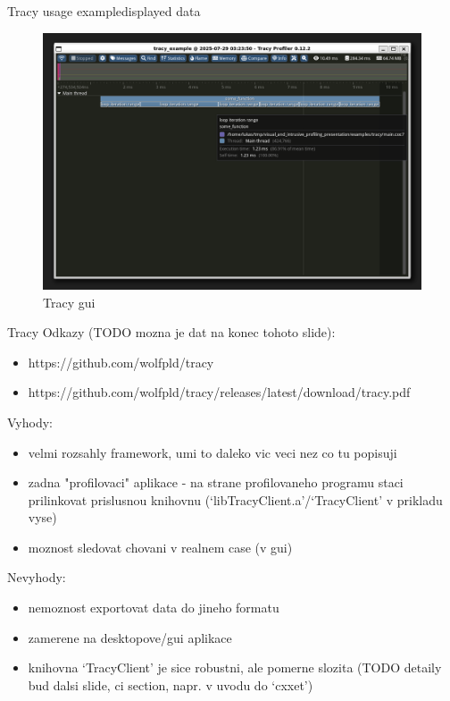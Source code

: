 \documentclass[aspectratio=169]{beamer}
\begin{document}
\begin{frame}{Tracy usage example}{displayed data}

    \begin{figure}[h]
        \centering
        \includegraphics[width=\textwidth,height=0.7\textheight,keepaspectratio]{pics/tracy/gui2.png}
        \caption{Tracy gui}
    \end{figure}

\end{frame}

\begin{frame}{Tracy}
    Odkazy (TODO mozna je dat na konec tohoto slide):

    \begin{itemize}
        \item https://github.com/wolfpld/tracy
        \item https://github.com/wolfpld/tracy/releases/latest/download/tracy.pdf
    \end{itemize}

    Vyhody:

    \begin{itemize}
        \item velmi rozsahly framework, umi to daleko vic veci nez co tu popisuji
        \item zadna "profilovaci" aplikace - na strane profilovaneho programu staci prilinkovat prislusnou knihovnu (`libTracyClient.a'/`TracyClient' v prikladu vyse)
        \item moznost sledovat chovani v realnem case (v gui)
    \end{itemize}

    Nevyhody:

    \begin{itemize}
        \item nemoznost exportovat data do jineho formatu
        \item zamerene na desktopove/gui aplikace
        \item knihovna `TracyClient' je sice robustni, ale pomerne slozita (TODO detaily bud dalsi slide, ci section, napr. v uvodu do `cxxet')
    \end{itemize}

\end{frame}
\end{document}
